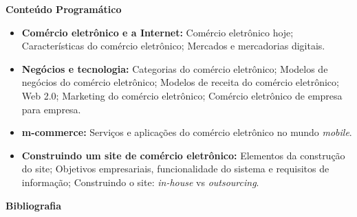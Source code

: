 
\begin{snugshade}\begin{center}\textbf{
    Conteúdo Programático
}\end{center}\end{snugshade}

\begin{itemize}

\item \textbf{Comércio eletrônico e a Internet:}
    Comércio eletrônico hoje;
    Características do comércio eletrônico;
    Mercados e mercadorias digitais.

\item \textbf{Negócios e tecnologia:}
    Categorias do comércio eletrônico;
    Modelos de negócios do comércio eletrônico;
    Modelos de receita do comércio eletrônico;
    Web 2.0;
    Marketing do comércio eletrônico;
    Comércio eletrônico de empresa para empresa.

\item \textbf{m-commerce:}
    Serviços e aplicações do comércio eletrônico no mundo \textit{mobile}.

\item \textbf{Construindo um site de comércio eletrônico:}
    Elementos da construção do site;
    Objetivos empresariais, funcionalidade do sistema e requisitos de informação;
    Construindo o site: \textit{in-house} vs \textit{outsourcing}.

\end{itemize}


%
%
%


\begin{snugshade}\begin{center}\textbf{
    Bibliografia
}\end{center}\end{snugshade}


